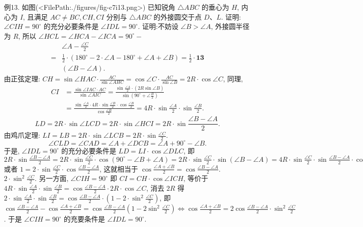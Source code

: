 例13. 如图(<FilePath:./figures/fig-c7i13.png>) 已知锐角 $\triangle A B C$ 的垂心为 $H$, 内心为 $I$, 且满足 $A C \neq B C, C H, C I$ 分别与 $\triangle A B C$ 的外接圆交于点 $D 、 L$. 证明: $\angle C I H=90^{\circ}$ 的充分必要条件是 $\angle I D L=90^{\circ}$.
证明:不妨设 $\angle B>\angle A$, 外接圆半径为 $R$,
所以 $\angle H C L=\angle H C A-\angle I C A=90^{\circ}-$
$$
\begin{aligned}
& \angle A-\frac{\angle C}{2} \\
= & \frac{1}{2} \cdot\left(180^{\circ}-2 \cdot \angle A-180^{\circ}+\angle A+\angle B\right)=\frac{1}{2} \cdot \mathbf{1 3} \\
& (\angle B-\angle A) .
\end{aligned}
$$
由正弦定理: $C H=\sin \angle H A C \cdot \frac{A C}{\sin \angle A H C}=\cos \angle C \cdot \frac{A C}{\sin \angle B}=2 R \cdot \cos \angle C $,
同理,
$$
\begin{aligned}
C I & =\frac{\sin \angle I A C \cdot A C}{\sin \angle A I C}=\frac{\sin \frac{\angle A}{2} \cdot(2 R \sin \angle B)}{\sin \left(90^{\circ}+\angle \frac{B}{2}\right)} \\
& =\frac{\sin \frac{\angle A}{2} \cdot 4 R \cdot \sin \frac{\angle B}{2} \cdot \cos \frac{\angle B}{2}}{\cos \frac{\angle B}{2}}=4 R \cdot \sin \frac{\angle A}{2} \cdot \sin \frac{\angle B}{2} .
\end{aligned}
$$
$$
L D=2 R \cdot \sin \angle L C D=2 R \cdot \sin \angle H C I=2 R \cdot \sin \frac{\angle B-\angle A}{2} .
$$
由鸡爪定理: $L I=L B=2 R \cdot \sin \angle L C B=2 R \cdot \sin \frac{\angle C}{2}$.
$$
\angle C L D=\angle C A D=\angle A+\angle D C B=\angle A+90^{\circ}-\angle B .
$$
于是, $\angle I D L=90^{\circ}$ 的充分必要条件是 $L D=L I \cdot \cos \angle D L C$, 即 $2 R \cdot\sin \frac{\angle B-\angle A}{2}=2 R \cdot \sin \frac{\angle C}{2} \cdot \cos \left(90^{\circ}-\angle B+\angle A\right)=2 R \cdot \sin \frac{\angle C}{2} \cdot\sin (\angle B-\angle A)=4 R \cdot \sin \frac{\angle C}{2} \cdot \sin \frac{\angle B-\angle A}{2} \cdot \cos \frac{\angle B-\angle A}{2}$ 或者 $1=2 \cdot \sin \frac{\angle C}{2} \cdot \cos \frac{\angle B-\angle A}{2}$, 这就相当于 $\cos \frac{\angle A+\angle B}{2}=\cos \frac{\angle B-\angle A}{2}$.
$2 \cdot \sin ^2 \frac{\angle C}{2}$.
另一方面, $\angle C I H=90^{\circ}$ 即 $C I=C H \cdot \cos \angle I C H$,
等价于 $4 R \cdot \sin \frac{\angle A}{2} \cdot \sin \frac{\angle B}{2}=\cos \frac{\angle B-\angle A}{2} \cdot 2 R \cdot \cos \angle C$, 消去 $2 R$ 得
$2 \cdot \sin \frac{\angle A}{2} \cdot \sin \frac{\angle B}{2}=\cos \frac{\angle B-\angle A}{2} \cdot\left(1-2 \cdot \sin ^2 \frac{\angle C}{2}\right)$, 即 $\cos \frac{\angle B-\angle A}{2}-\cos \frac{\angle A+\angle B}{2}=\cos \frac{\angle B-\angle A}{2}\left(1-2 \sin ^2 \frac{\angle C}{2}\right) \Leftrightarrow \cos \frac{\angle A+\angle B}{2}= 2 \cos \frac{\angle B-\angle A}{2} \cdot \sin ^2 \frac{\angle C}{2}$.
于是 $\angle C I H=90^{\circ}$ 的充要条件是 $\angle I D L=90^{\circ}$.



